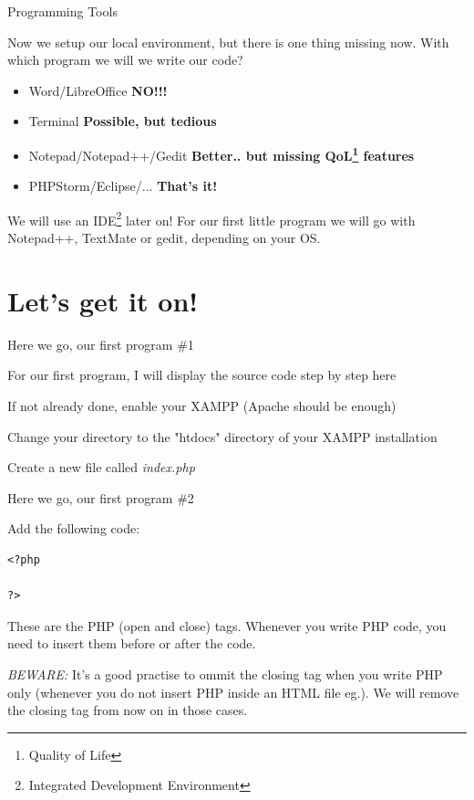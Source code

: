\begin{frame}{Programming Tools}

Now we setup our local environment, but there is one thing missing now.
With which program we will we write our code? \pause
	
	\begin{itemize}
		\item Word/LibreOffice \pause \textbf{NO!!!} \pause
		\item Terminal \pause \textbf{Possible, but tedious} \pause
		\item Notepad/Notepad++/Gedit \pause \textbf{Better.. but missing QoL\footnote{Quality of Life} features} \pause
		\item PHPStorm/Eclipse/... \pause \textbf{That's it!} \pause
	\end{itemize}
	
	We will use an IDE\footnote{Integrated Development Environment} later on!
	For our first little program we will go with Notepad++, TextMate or gedit, depending on your OS.
	
\end{frame}

\section{Let's get it on!}
\begin{frame}[fragile]{Here we go, our first program \#{}1}

For our first program, I will display the source code step by step here \pause

If not already done, enable your XAMPP (Apache should be enough) \pause

Change your directory to the "htdocs" directory of your XAMPP installation \pause

Create a new file called \textit{index.php} \pause

\end{frame}


\begin{frame}[fragile]{Here we go, our first program \#{}2}

Add the following code:

	\begin{lstlisting}
<?php
	
?>
	\end{lstlisting}
	
	\pause
	These are the PHP (open and close) tags. Whenever you write PHP code, you need to insert them before or after the code. \pause
	
	\emph{BEWARE:} It's a good practise to ommit the closing tag when you write PHP only (whenever you do not insert PHP inside an HTML file eg.). We will remove the closing tag from now on in those cases.
\end{frame}

